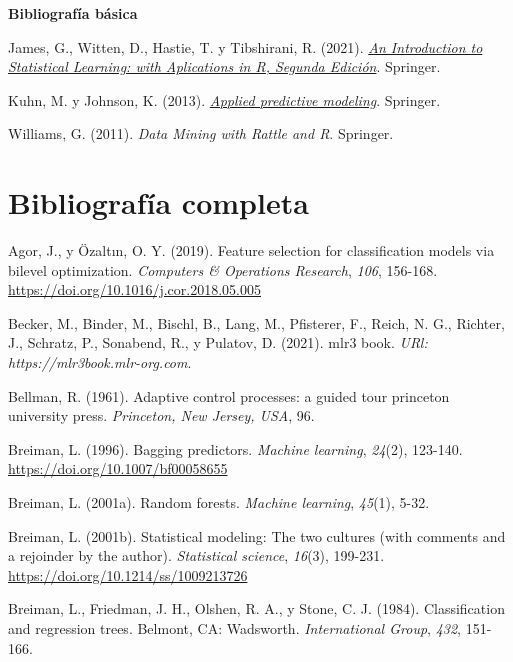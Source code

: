 \documentclass[
  spanish,
]{book}
\theoremstyle{break}
\theoremstyle{definition}
\theoremstyle{definition}
\theoremstyle{definition}
\theoremstyle{remark}
\begin{document}
\textbf{Bibliografía básica}

James, G., Witten, D., Hastie, T. y Tibshirani, R. (2021). \emph{\href{https://www.statlearning.com}{An Introduction to Statistical Learning: with Aplications in R, Segunda Edición}}. Springer.

Kuhn, M. y Johnson, K. (2013). \emph{\href{http://appliedpredictivemodeling.com}{Applied predictive modeling}}. Springer.

Williams, G. (2011). \emph{Data Mining with Rattle and R}. Springer.

\hypertarget{bibliografuxeda-completa}{%
\section*{Bibliografía completa}\label{bibliografuxeda-completa}}

\hypertarget{refs}{}
\leavevmode\hypertarget{ref-agor2019feature}{}%
Agor, J., y Özaltın, O. Y. (2019). Feature selection for classification models via bilevel optimization. \emph{Computers \& Operations Research}, \emph{106}, 156-168. \url{https://doi.org/10.1016/j.cor.2018.05.005}

\leavevmode\hypertarget{ref-becker2021mlr3}{}%
Becker, M., Binder, M., Bischl, B., Lang, M., Pfisterer, F., Reich, N. G., Richter, J., Schratz, P., Sonabend, R., y Pulatov, D. (2021). mlr3 book. \emph{URl: https://mlr3book.mlr-org.com}.

\leavevmode\hypertarget{ref-bellman1961adaptive}{}%
Bellman, R. (1961). Adaptive control processes: a guided tour princeton university press. \emph{Princeton, New Jersey, USA}, 96.

\leavevmode\hypertarget{ref-breiman1996bagging}{}%
Breiman, L. (1996). Bagging predictors. \emph{Machine learning}, \emph{24}(2), 123-140. \url{https://doi.org/10.1007/bf00058655}

\leavevmode\hypertarget{ref-breiman2001random}{}%
Breiman, L. (2001a). Random forests. \emph{Machine learning}, \emph{45}(1), 5-32.

\leavevmode\hypertarget{ref-breiman2001statistical}{}%
Breiman, L. (2001b). Statistical modeling: The two cultures (with comments and a rejoinder by the author). \emph{Statistical science}, \emph{16}(3), 199-231. \url{https://doi.org/10.1214/ss/1009213726}

\leavevmode\hypertarget{ref-breiman1984classification}{}%
Breiman, L., Friedman, J. H., Olshen, R. A., y Stone, C. J. (1984). Classification and regression trees. Belmont, CA: Wadsworth. \emph{International Group}, \emph{432}, 151-166.
\end{document}
